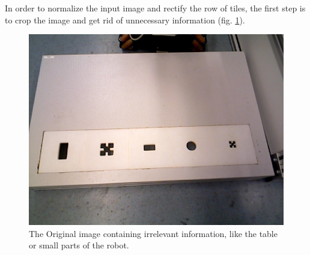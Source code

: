 \documentclass{article}
\begin{document}
In order to normalize the input image and rectify the row of tiles, the first step is to crop the image and get rid of unnecessary information (fig. \ref{fig:original}). \\
\begin{figure}[h!]
\centering
\includegraphics[scale=0.3]{images/frame01.jpg}
\caption{The Original image containing irrelevant information, like the table or small parts of the robot.}
\label{fig:original}
\end{figure}
\end{document}
